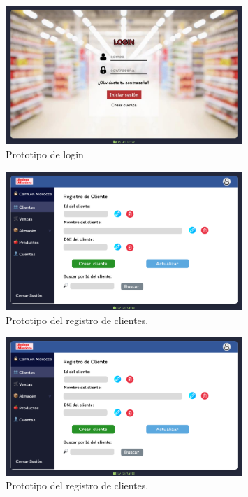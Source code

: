 \documentclass{article}
\begin{document}

\begin{figure}[H]
  \centering
  \includegraphics[width=0.8\textwidth]{./assets/login.png}
  \caption{Prototipo de login}
\end{figure}

\begin{figure}[H]
  \centering
  \includegraphics[width=0.8\textwidth]{./assets/registro.png}
  \caption{Prototipo del registro de clientes.}
\end{figure}

\begin{figure}[H]
  \centering
  \includegraphics[width=0.8\textwidth]{./assets/registro.png}
  \caption{Prototipo del registro de clientes.}
\end{figure}
\end{document}
